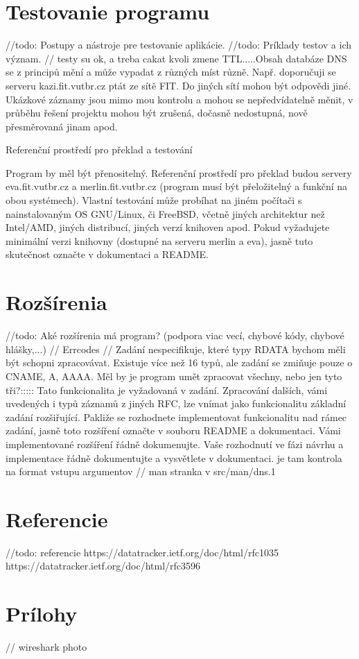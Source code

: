 \documentclass[a4paper, 11pt]{article}
\begin{document}
	\section{Testovanie programu}
	//todo: Postupy a nástroje pre testovanie aplikácie.
	//todo: Príklady testov a ich význam.
	// testy su ok, a treba cakat kvoli zmene TTL.....Obsah databáze DNS se z principů mění a může vypadat z různých míst různě. Např. doporučuji se serveru kazi.fit.vutbr.cz ptát ze sítě FIT. Do jiných sítí mohou být odpovědi jiné. Ukázkové záznamy jsou mimo mou kontrolu a mohou se nepředvídatelně měnit, v průběhu řešení projektu mohou být zrušená, dočasně nedostupná, nově přesměrovaná jinam apod.
	
	Referenční prostředí pro překlad a testování

	Program by měl být přenositelný. Referenční prostředí pro překlad budou servery eva.fit.vutbr.cz a merlin.fit.vutbr.cz (program musí být přeložitelný a funkční na obou systémech). Vlastní testování může probíhat na jiném počítači s nainstalovaným OS GNU/Linux, či FreeBSD, včetně jiných architektur než Intel/AMD, jiných distribucí, jiných verzí knihoven apod. Pokud vyžadujete minimální verzi knihovny (dostupné na serveru merlin a eva), jasně tuto skutečnost označte v dokumentaci a README.


	\section{Rozšírenia}
	//todo: Aké rozšírenia má program? (podpora viac vecí, chybové kódy, chybové hlášky,...)
	// Errcodes
	// Zadání nespecifikuje, které typy RDATA bychom měli být schopni zpracovávat. Existuje více než 16 typů, ale zadání se zmiňuje pouze o CNAME, A, AAAA. Měl by je program umět zpracovat všechny, nebo jen tyto tři?:::::	Tato funkcionalita je vyžadovaná v zadání. Zpracování dalších, vámi uvedených i typů záznamů z jiných RFC, lze vnímat jako funkcionalitu základní zadání rozšiřující. Pakliže se rozhodnete implementovat funkcionalitu nad rámec zadání, jasně toto rozšíření označte v souboru README a dokumentaci. Vámi implementované rozšíření řádně dokumenujte. Vaše rozhodnutí ve fázi návrhu a implementace řádně dokumentujte a vysvětlete v dokumentaci.
	je tam kontrola na format vstupu argumentov
	// man stranka v src/man/dns.1


	\section{Referencie}
	//todo: referencie
	https://datatracker.ietf.org/doc/html/rfc1035
	https://datatracker.ietf.org/doc/html/rfc3596

	\section{Prílohy}
	// wireshark photo
\end{document}
